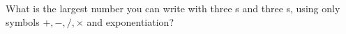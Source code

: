 What is the largest number you can write with three s and three s, using only symbols $+,-,/,\times$ and exponentiation?
